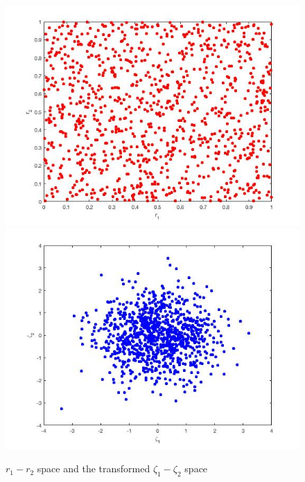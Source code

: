 \documentclass[12pt, oneside]{article}   	%
\begin{document}
	\begin{figure} [!htbp]
	 \includegraphics[scale=0.40]{r1r2_space.jpg}
	 \includegraphics[scale=0.40]{zeta1zeta2_space.jpg}
	\caption{$r_1-r_2$ space and the transformed $\zeta_1-\zeta_2$ space}
	\end{figure}


\end{document}

